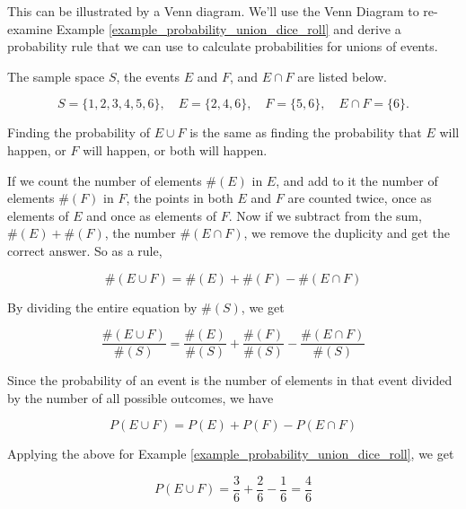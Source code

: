This can be illustrated by a Venn diagram. We'll use the Venn Diagram to re-examine Example \ref{example_probability_union_dice_roll} and derive a probability rule that we can use to calculate probabilities for unions of events.

The sample space \( S \), the events \( E \) and \( F \), and \( E \cap F \) are listed below.

\[ S = \{1, 2, 3, 4, 5, 6\}, \quad E = \{2, 4, 6\}, \quad F = \{5, 6\}, \quad E \cap F = \{6\}. \]

\begin{center}
    \begin{venndiagram2sets}[
            labelA=\(E\),
            labelB=\(F\),
            labelAB={\{6\}},
            labelOnlyA={\{2,4\}},
            labelOnlyB={\{5\}},
        ]
    \end{venndiagram2sets}
\end{center}


Finding the probability of \( E \cup F \) is the same as finding the probability that \( E \) will happen, or \( F \) will happen, or both will happen.

If we count the number of elements \( \#(E) \) in \( E \), and add to it the number of elements \( \#(F) \) in \( F \), the points in both \( E \) and \( F \) are counted twice, once as elements of \( E \) and once as elements of \( F \). Now if we subtract from the sum, \( \#(E) + \#(F) \), the number \( \#(E \cap F) \), we remove the duplicity and get the correct answer. So as a rule,

\[ \#(E \cup F) = \#(E) + \#(F) - \#(E \cap F) \]

By dividing the entire equation by \( \#(S) \), we get

\[ \frac{\#(E \cup F)}{\#(S)} = \frac{\#(E)}{\#(S)} + \frac{\#(F)}{\#(S)} - \frac{\#(E \cap F)}{\#(S)} \]

Since the probability of an event is the number of elements in that event divided by the number of all possible outcomes, we have

\[ P(E \cup F) = P(E) + P(F) - P(E \cap F) \]

Applying the above for Example \ref{example_probability_union_dice_roll}, we get

\[ P(E \cup F) = \frac{3}{6} + \frac{2}{6} - \frac{1}{6} = \frac{4}{6} \]

